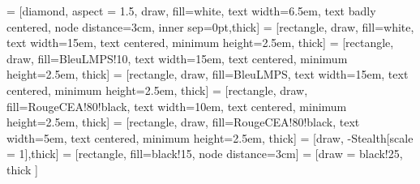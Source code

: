  = [diamond, aspect = 1.5, draw, fill=white, text width=6.5em, text badly centered, node distance=3cm, inner sep=0pt,thick]
 = [rectangle, draw, fill=white, text width=15em, text centered, minimum height=2.5em, thick]
 = [rectangle, draw, fill=BleuLMPS!10, text width=15em, text centered, minimum height=2.5em, thick]
 = [rectangle, draw, fill=BleuLMPS, text width=15em, text centered, minimum height=2.5em, thick]
 = [rectangle, draw, fill=RougeCEA!80!black, text width=10em, text centered, minimum height=2.5em, thick]
 = [rectangle, draw, fill=RougeCEA!80!black, text width=5em, text centered, minimum height=2.5em, thick]
 = [draw, -{Stealth[scale = 1]},thick]
 = [rectangle, fill=black!15, node distance=3cm]
 = [draw = black!25, thick ]

